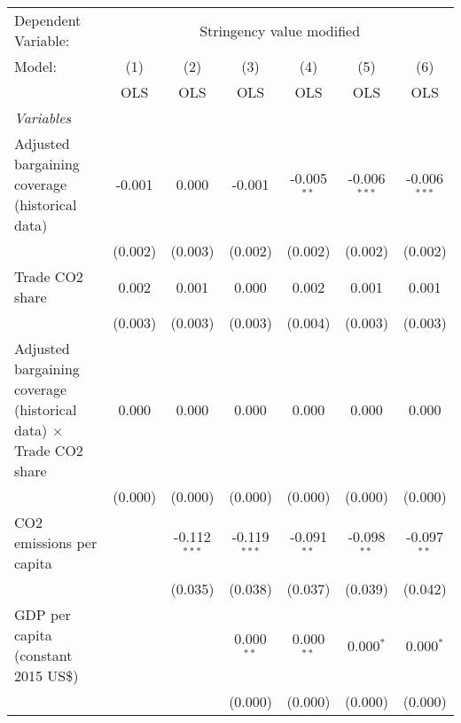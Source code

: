 
\begingroup
\centering
\begin{tabular}{lcccccc}
   \toprule
   Dependent Variable: & \multicolumn{6}{c}{Stringency value modified}\\
   Model:                                                                   & (1)     & (2)            & (3)            & (4)           & (5)            & (6)\\  
                                                                            &  OLS    & OLS            & OLS            & OLS           & OLS            & OLS\\  
   \midrule
   \emph{Variables}\\
   Adjusted bargaining coverage (historical data)                           & -0.001  & 0.000          & -0.001         & -0.005$^{**}$ & -0.006$^{***}$ & -0.006$^{***}$\\   
                                                                            & (0.002) & (0.003)        & (0.002)        & (0.002)       & (0.002)        & (0.002)\\   
   Trade CO2 share                                                          & 0.002   & 0.001          & 0.000          & 0.002         & 0.001          & 0.001\\   
                                                                            & (0.003) & (0.003)        & (0.003)        & (0.004)       & (0.003)        & (0.003)\\   
   Adjusted bargaining coverage (historical data) $\times$ Trade CO2 share  & 0.000   & 0.000          & 0.000          & 0.000         & 0.000          & 0.000\\   
                                                                            & (0.000) & (0.000)        & (0.000)        & (0.000)       & (0.000)        & (0.000)\\   
   CO2 emissions per capita                                                 &         & -0.112$^{***}$ & -0.119$^{***}$ & -0.091$^{**}$ & -0.098$^{**}$  & -0.097$^{**}$\\   
                                                                            &         & (0.035)        & (0.038)        & (0.037)       & (0.039)        & (0.042)\\   
   GDP per capita (constant 2015 US\$)                                      &         &                & 0.000$^{**}$   & 0.000$^{**}$  & 0.000$^{*}$    & 0.000$^{*}$\\   
                                                                            &         &                & (0.000)        & (0.000)       & (0.000)        & (0.000)\\   

\end{tabular}
